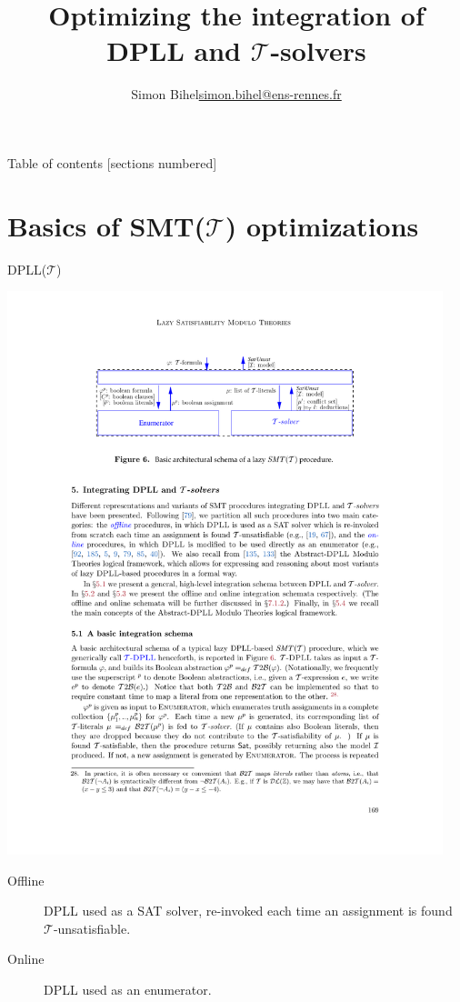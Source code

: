 \documentclass{beamer}
\title{Optimizing the integration of DPLL and $\mathcal{T}$-solvers}
\date{\displaydate{defensedate}}
\author{%
  Simon Bihel\hfill\url{simon.bihel@ens-rennes.fr} \\
}
\institute{%
  University of Rennes I \\
  \'Ecole Normale Sup\'erieure de Rennes
}
\begin{document}
\maketitle

\begin{frame}{Table of contents}
  [sections numbered]
  \tableofcontents[hideallsubsections]
\end{frame}


\section{Basics of SMT($\mathcal{T}$) optimizations}

\begin{frame}{DPLL($\mathcal{T}$)}
  \begin{center}
    \includegraphics[width=0.95\textwidth]{LazySurvey_fig6}
  \end{center}
  \begin{description}
    \item[Offline] DPLL used as a SAT solver, re-invoked each time an assignment is found $\mathcal{T}$-unsatisfiable.
    \item[Online] DPLL used as an enumerator.
  \end{description}
\end{frame}
\end{document}
